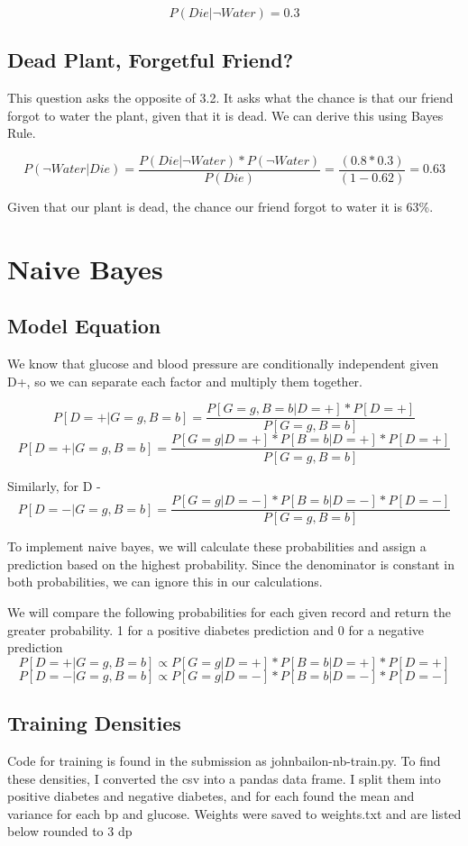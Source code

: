 \documentclass{article}
\begin{document}
\[P(Die | \neg Water) = 0.3\]

\subsection{Dead Plant, Forgetful Friend?}
This question asks the opposite of 3.2. It asks what the chance is that our friend forgot to water the plant, given that it is dead. We can derive this using Bayes Rule.

\[P(\neg Water | Die) = \frac{P(Die | \neg Water) * P(\neg Water)}{P(Die)} = \frac{(0.8*0.3)}{(1-0.62)} = 0.63\]

Given that our plant is dead, the chance our friend forgot to water it is 63\%.

\newpage
\section{Naive Bayes}

\subsection{Model Equation}
We know that glucose and blood pressure are conditionally independent given D+, so we can separate each factor and multiply them together.

\[P[D=+ |G =g, B=b] = \frac{P[G=g,B=b|D=+] * P[D=+]}{P[G=g, B=b]} \]
\[P[D=+ |G =g, B=b] = \frac{P[G=g|D=+] * P[B=b|D=+] * P[D=+]}{P[G=g, B=b]} \]

Similarly, for D - 
\[P[D=- |G =g, B=b] = \frac{P[G=g|D=-] * P[B=b|D=-] * P[D=-]}{P[G=g, B=b]} \]

To implement naive bayes, we will calculate these probabilities and assign a prediction based on the highest probability. Since the denominator is constant in both probabilities, we can ignore this in our calculations.

We will compare the following probabilities for each given record and return the greater probability. 1 for a positive diabetes prediction and 0 for a negative prediction 
\[P[D=+ |G =g, B=b] \propto P[G=g|D=+] * P[B=b|D=+] * P[D=+] \]
\[P[D=- |G =g, B=b] \propto P[G=g|D=-] * P[B=b|D=-] * P[D=-] \]

\subsection{Training Densities}
Code for training is found in the submission as johnbailon-nb-train.py. To find these densities, I converted the csv into a pandas data frame. I split them into positive diabetes and negative diabetes, and for each found the mean and variance for each bp and glucose.
Weights were saved to weights.txt and are listed below rounded to 3 dp
\end{document}
